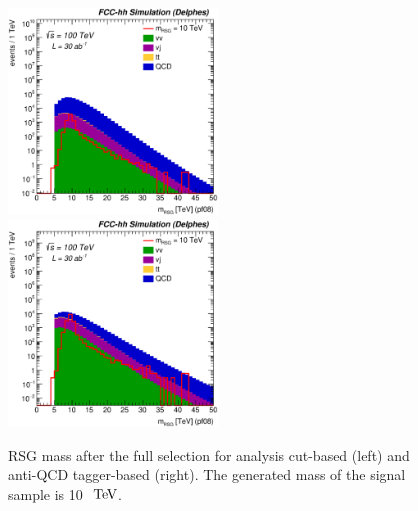 \documentclass{cernrep}
\begin{document}
\begin{figure}[!htb]\centering
\includegraphics[width=0.495\textwidth]{Fig/RSGww/Mj1j2_pf08_fit_sel2_nostack_log.eps}
\includegraphics[width=0.495\textwidth]{Fig/RSGww/Mj1j2_pf08_fit_sel4_nostack_log.eps}
\caption{RSG mass after the full selection for analysis cut-based (left) and anti-QCD tagger-based (right). The generated mass of the signal sample is 10 $\TeV$.}
\label{fig:RSGww_mass_sel_final}
\end{figure}
\end{document}
